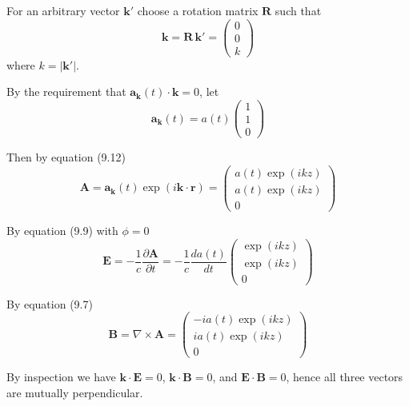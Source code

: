 


\bigskip
For an arbitrary vector $\mathbf k'$
choose a rotation matrix $\mathbf R$ such that
\begin{equation*}
\mathbf k=\mathbf R\,\mathbf k'=\begin{pmatrix}0\\0\\k\end{pmatrix}
\end{equation*}
where $k=|\mathbf k'|$.

\bigskip
By the requirement that $\mathbf a_{\mathbf k}(t)\cdot\mathbf k=0$, let
\begin{equation*}
\mathbf a_{\mathbf k}(t)=a(t)\begin{pmatrix}1\\1\\0\end{pmatrix}
\end{equation*}

Then by equation (9.12)
\begin{equation*}
\mathbf A=\mathbf a_{\mathbf k}(t)\exp(i\mathbf k\cdot\mathbf r)
=\begin{pmatrix}
a(t)\exp(ikz)
\\[1ex]
a(t)\exp(ikz)
\\[1ex]
0
\end{pmatrix}
\end{equation*}

By equation (9.9) with $\phi=0$
\begin{equation*}
\mathbf E=-\frac{1}{c}\frac{\partial\mathbf A}{\partial t}=
-\frac{1}{c}\frac{da(t)}{dt}
\begin{pmatrix}
\exp(ikz)
\\[1ex]
\exp(ikz)
\\[1ex]
0
\end{pmatrix}
\end{equation*}

By equation (9.7)
\begin{equation*}
\mathbf B=\nabla\times\mathbf A=
\begin{pmatrix}
-ia(t)\exp(ikz)
\\[1ex]
ia(t)\exp(ikz)
\\[1ex]
0
\end{pmatrix}
\end{equation*}

By inspection we have $\mathbf k\cdot\mathbf E=0$, $\mathbf k\cdot\mathbf B=0$,
and $\mathbf E\cdot\mathbf B=0$, hence all three vectors are mutually perpendicular.


